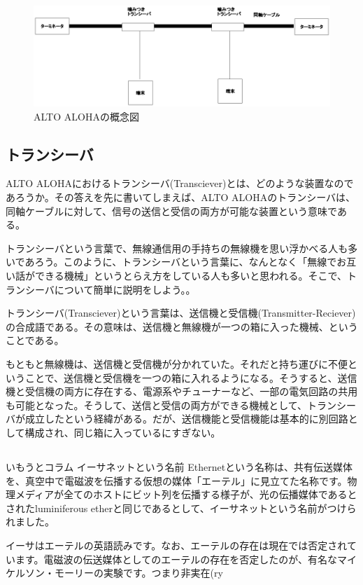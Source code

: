 \begin{figure}[htbp]
	\includegraphics[width=12cm,clip]{draw/altoaloha.eps}
	\caption{ALTO ALOHAの概念図}
	\label{fig:altoaloha}
\end{figure}

\subsection{トランシーバ}

ALTO ALOHAにおけるトランシーバ(Transciever)とは、どのような装置なのであろうか。その答えを先に書いてしまえば、ALTO ALOHAのトランシーバは、同軸ケーブルに対して、信号の送信と受信の両方が可能な装置という意味である。

トランシーバという言葉で、無線通信用の手持ちの無線機を思い浮かべる人も多いであろう。このように、トランシーバという言葉に、なんとなく「無線でお互い話ができる機械」というとらえ方をしている人も多いと思われる。そこで、トランシーバについて簡単に説明をしよう。。

トランシーバ(Transciever)という言葉は、送信機と受信機(Transmitter-Reciever)の合成語である。その意味は、送信機と無線機が一つの箱に入った機械、ということである。

もともと無線機は、送信機と受信機が分かれていた。それだと持ち運びに不便ということで、送信機と受信機を一つの箱に入れるようになる。そうすると、送信機と受信機の両方に存在する、電源系やチューナーなど、一部の電気回路の共用も可能となった。そうして、送信と受信の両方ができる機械として、トランシーバが成立したという経緯がある。だが、送信機能と受信機能は基本的に別回路として構成され、同じ箱に入っているにすぎない。

\subsection*{}
\begin{itembox}[l]{いもうとコラム イーサネットという名前}
Ethernetという名称は、共有伝送媒体を、真空中で電磁波を伝播する仮想の媒体「エーテル」に見立てた名称です。物理メディアが全てのホストにビット列を伝播する様子が、光の伝播媒体であるとされたluminiferous etherと同じであるとして、イーサネットという名前がつけられました。

イーサはエーテルの英語読みです。なお、エーテルの存在は現在では否定されています。電磁波の伝送媒体としてのエーテルの存在を否定したのが、有名なマイケルソン・モーリーの実験です。つまり非実在(ry
\end{itembox}

